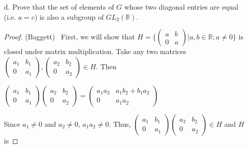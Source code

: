\documentclass[10pt]{article}
\renewcommand{\emptyset}{\varnothing}
\begin{document}
\begin{itemize}
\begin{itemize}
(Baggett) \ Firstly, $\emptyset \neq G \subseteq GL_{2}(\mathbb{R})$, since
	$\det\begin{pmatrix}a & b \\ 0 & c\end{pmatrix} = ac \neq 0$ because $a \neq 0$ and
	$c \neq 0$. Secondly, $G$ is closed under inverses and matrix multiplication. This
	is enough to show that $G$ is a subgroup of $GL_{2}(\mathbb{R})$. (If $A \in G$, then
	$A^{-1} \in G$, and $AA^{-1} = I_2 \in G$ since $G$ is closed under multiplication.
	Since matrix multiplication is associative in $GL_{2}(\mathbb{R})$, matrix multiplication
	is associative in $G$.) Therefore, $G$ is a subgroup of $GL_{2}(\mathbb{R})$.
	
	\item[d.] Prove that the set of elements of $G$ whose two diagonal entries are equal
	(i.e. $a = c$) is also a subgroup of $GL_{2}(\mathbb{R})$.
	\begin{proof} (Baggett) \ First, we will show that $H = \{\begin{pmatrix}a & b \\ 0 & a\end{pmatrix} |
		a,b \in \mathbb{R}; a \neq 0\}$ is closed under matrix multiplication. Take any two matrices
		$\begin{pmatrix}a_1 & b_1 \\ 0 & a_1\end{pmatrix}, \begin{pmatrix}a_2 & b_2 \\ 0 & a_2\end{pmatrix}
		\in H$. Then
			\begin{center}
				$\begin{pmatrix}a_1 & b_1 \\ 0 & a_1\end{pmatrix}
				\begin{pmatrix}a_2 & b_2 \\ 0 & a_2\end{pmatrix} =
				\begin{pmatrix}a_1a_2 & a_1b_2 + b_1a_2 \\ 0 & a_1a_2\end{pmatrix}$
			\end{center}
		Since $a_1 \neq 0$ and $a_2 \neq 0$, $a_1a_2 \neq 0$. Thus,
		$\begin{pmatrix}a_1 & b_1 \\ 0 & a_1\end{pmatrix}
		\begin{pmatrix}a_2 & b_2 \\ 0 & a_2\end{pmatrix} \in H$ and $H$ is

\end{proof}
\end{itemize}
\end{itemize}
\end{document}
